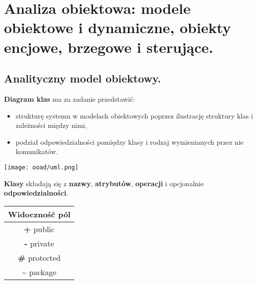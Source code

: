 \documentclass[main.tex]{subfiles}
\begin{document}
    \section{Analiza obiektowa: modele obiektowe i dynamiczne, obiekty encjowe, brzegowe i sterujące.}

    \subsection{Analityczny model obiektowy.}
    \textbf{Diagram klas} ma za zadanie przedstawić:
    \begin{itemize}
        \item strukturę systemu w modelach obiektowych poprzez
        ilustrację struktury klas i zależności między nimi,
        \item podział odpowiedzialności pomiędzy klasy i rodzaj wymienianych przez nie komunikatów.
    \end{itemize}

    \begin{center}
        \texttt{[image: ooad/uml.png]}
    \end{center}

    \noindent \textbf{Klasy} składają się z \textbf{nazwy}, \textbf{atrybutów}, \textbf{operacji} i opcjonalnie
    \textbf{odpowiedzialności}.

    \begin{table}[H]
        \begin{center}
            \begin{tabular}{c}
                \textbf{Widoczność pól}\\
                \hline
                \textbf{+} public\\
                \textbf{-} private\\
                \textbf{\#} protected\\
                \textbf{\~} package
            \end{tabular}
        \end{center}
    \end{table}
\end{document}
